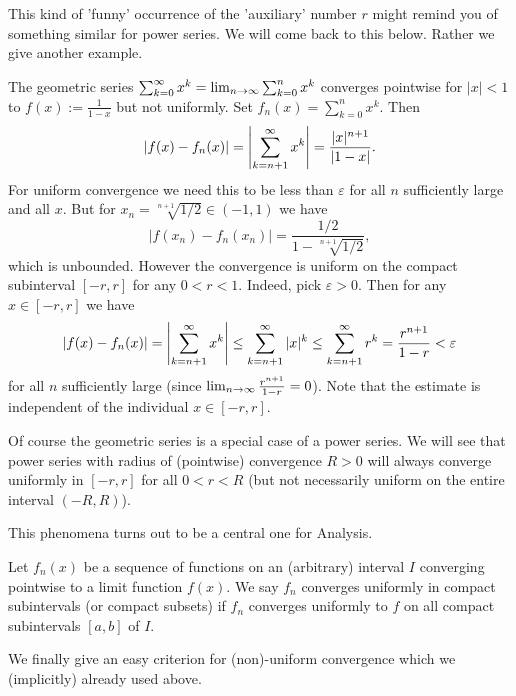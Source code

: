 \documentclass[10pt, a4paper]{article}
\begin{document}
This kind of 'funny' occurrence of the 'auxiliary' number $r$ might remind you of something similar for power series.
We will come back to this below.
Rather we give another example.

\begin{example}
    The geometric series $\infsumo x ^ k = \liminfty\sum_{k = 0}^{n}x ^ k$ converges pointwise for $|x| < 1$ to $f(x) := \frac{1}{1 - x}$ but not uniformly.
    Set $f_n(x) = \sum_{k = 0}^{n}x ^ k$.
    Then
    \[
    |f(x) - f_n(x)| = \left|\infsum[k = n + 1]x ^ k\right| = \frac{|x| ^ {n + 1}}{|1 - x|}.
    \]
    For uniform convergence we need this to be less than $\varepsilon$ for all $n$ sufficiently large and all $x$.
    But for $x_n = \sqrt[n + 1]{1 / 2} \in (-1, 1)$ we have
    \[
    |f(x_n) - f_n(x_n)| = \frac{1 / 2}{1 - \sqrt[n + 1]{1 / 2}},
    \]
    which is unbounded.
    However the convergence is uniform on the compact subinterval $[-r, r]$ for any $0 < r < 1$.
    Indeed,
    pick $\varepsilon > 0$.
    Then for any $x \in [-r, r]$ we have
    \[
    |f(x) - f_n(x)| = \left|\infsum[k = n + 1]x ^ k\right| \leq \infsum[k = n + 1]|x| ^ k \leq \infsum[k = n + 1]r ^ k = \frac{r ^ {n + 1}}{1 - r} < \varepsilon
    \]
    for all $n$ sufficiently large
    (since $\liminfty\frac{r ^ {n + 1}}{1 - r} = 0$).
    Note that the estimate is independent of the individual $x \in [-r, r]$.
\end{example}

Of course the geometric series is a special case of a power series.
We will see that power series with radius of
(pointwise)
convergence $R > 0$ will always converge uniformly in $[-r, r]$ for all $0 < r < R$
(but not necessarily uniform on the entire interval $(-R, R)$).

This phenomena turns out to be a central one for Analysis.

\begin{definition}
    Let $f_n(x)$ be a sequence of functions on an
    (arbitrary)
    interval $I$ converging pointwise to a limit function $f(x)$.
    We say $f_n$ converges uniformly in compact subintervals
    (or compact subsets)
    if $f_n$ converges uniformly to $f$ on all compact subintervals $[a, b]$ of $I$.
\end{definition}

We finally give an easy criterion for
(non)-uniform convergence which we
(implicitly)
already used above.
\end{document}
